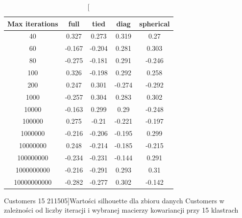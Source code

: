 \documentclass{classrep}
\begin{document}
{{            \begin{table}[!htbp]
                \begin{minipage}{1\textwidth}
                \centering
                \begin{tabular}{|c|c|c|c|c|}
                \hline
                Max iterations & full & tied & diag & spherical \\ \hline
                40 & 0.327 & 0.273 & 0.319 & 0.27 \\ \hline
                60 & -0.167 & -0.204 & 0.281 & 0.303 \\ \hline
                80 & -0.275 & -0.181 & 0.291 & -0.246 \\ \hline
                100 & 0.326 & -0.198 & 0.292 & 0.258 \\ \hline
                200 & 0.247 & 0.301 & -0.274 & -0.292 \\ \hline
                1000 & -0.257 & 0.304 & 0.283 & 0.302 \\ \hline
                10000 & -0.163 & 0.299 & 0.29 & -0.248 \\ \hline
                100000 & 0.275 & -0.21 & -0.221 & -0.197 \\ \hline
                1000000 & -0.216 & -0.206 & -0.195 & 0.299 \\ \hline
                10000000 & 0.248 & -0.214 & -0.185 & -0.215 \\ \hline
                100000000 & -0.234 & -0.231 & -0.144 & 0.291 \\ \hline
                1000000000 & -0.216 & -0.291 & 0.293 & 0.31 \\ \hline
                10000000000 & -0.282 & -0.277 & 0.302 & -0.142 \\ \hline
                \end{tabular}
                \caption
                [Customers 15 211505]{Wartości silhouette dla zbioru danych Customers w zależności od liczby iteracji i wybranej macierzy kowariancji przy 15 klastrach}
                \label{Customers_15_211505}
                \end{minipage}
                \hfill


\end{table}}}
\end{document}

